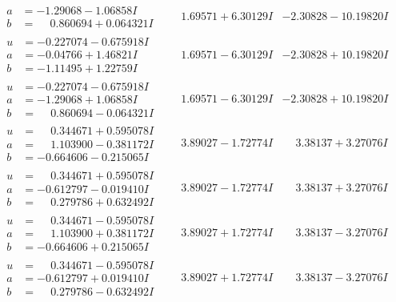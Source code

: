 \documentclass[1p]{elsarticle_modified}
\theoremstyle{definition}
\begin{document}
$$\begin{array}{c|c|c}
\begin{aligned}
a &= -1.29068 - 1.06858 I \\
b &= \phantom{-}0.860694 + 0.064321 I\end{aligned}
 & \phantom{-}1.69571 + 6.30129 I & -2.30828 - 10.19820 I \\ \hline\begin{aligned}
u &= -0.227074 - 0.675918 I \\
a &= -0.04766 + 1.46821 I \\
b &= -1.11495 + 1.22759 I\end{aligned}
 & \phantom{-}1.69571 - 6.30129 I & -2.30828 + 10.19820 I \\ \hline\begin{aligned}
u &= -0.227074 - 0.675918 I \\
a &= -1.29068 + 1.06858 I \\
b &= \phantom{-}0.860694 - 0.064321 I\end{aligned}
 & \phantom{-}1.69571 - 6.30129 I & -2.30828 + 10.19820 I \\ \hline\begin{aligned}
u &= \phantom{-}0.344671 + 0.595078 I \\
a &= \phantom{-}1.103900 - 0.381172 I \\
b &= -0.664606 - 0.215065 I\end{aligned}
 & \phantom{-}3.89027 - 1.72774 I & \phantom{-}3.38137 + 3.27076 I \\ \hline\begin{aligned}
u &= \phantom{-}0.344671 + 0.595078 I \\
a &= -0.612797 - 0.019410 I \\
b &= \phantom{-}0.279786 + 0.632492 I\end{aligned}
 & \phantom{-}3.89027 - 1.72774 I & \phantom{-}3.38137 + 3.27076 I \\ \hline\begin{aligned}
u &= \phantom{-}0.344671 - 0.595078 I \\
a &= \phantom{-}1.103900 + 0.381172 I \\
b &= -0.664606 + 0.215065 I\end{aligned}
 & \phantom{-}3.89027 + 1.72774 I & \phantom{-}3.38137 - 3.27076 I \\ \hline\begin{aligned}
u &= \phantom{-}0.344671 - 0.595078 I \\
a &= -0.612797 + 0.019410 I \\
b &= \phantom{-}0.279786 - 0.632492 I\end{aligned}
 & \phantom{-}3.89027 + 1.72774 I & \phantom{-}3.38137 - 3.27076 I \\ \hline\begin{aligned}

\end{aligned}
\end{array}$$
\end{document}
